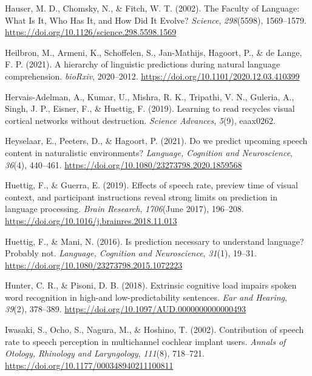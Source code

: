 \documentclass[a4paper, nobind]{templates/ociamthesis}
\newlength{\cslhangindent}
\newenvironment{CSLReferences}[2] %
 {%
  \setlength{\parindent}{0pt}
  \ifodd #1
  \let\oldpar\par
  \def\par{\hangindent=\cslhangindent\oldpar}
  \fi
  \setlength{\parskip}{1mm}
  \setlength{\baselineskip}{6mm}
 }%
 {}
\begin{document}
\begin{CSLReferences}{1}{0}
\leavevmode{}%
Hauser, M. D., Chomsky, N., \& Fitch, W. T. (2002). The Faculty of Language: What Is It, Who Has It, and How Did It Evolve? \emph{Science}, \emph{298}(5598), 1569--1579. \url{https://doi.org/10.1126/science.298.5598.1569}

\leavevmode{}%
Heilbron, M., Armeni, K., Schoffelen, S., Jan-Mathijs, Hagoort, P., \& de Lange, F. P. (2021). {A hierarchy of linguistic predictions during natural language comprehension}. \emph{bioRxiv}, 2020--2012. \url{https://doi.org/10.1101/2020.12.03.410399}

\leavevmode{}%
Hervais-Adelman, A., Kumar, U., Mishra, R. K., Tripathi, V. N., Guleria, A., Singh, J. P., Eisner, F., \& Huettig, F. (2019). Learning to read recycles visual cortical networks without destruction. \emph{Science Advances}, \emph{5}(9), eaax0262.

\leavevmode{}%
Heyselaar, E., Peeters, D., \& Hagoort, P. (2021). {Do we predict upcoming speech content in naturalistic environments?} \emph{Language, Cognition and Neuroscience}, \emph{36}(4), 440--461. \url{https://doi.org/10.1080/23273798.2020.1859568}

\leavevmode{}%
Huettig, F., \& Guerra, E. (2019). {Effects of speech rate, preview time of visual context, and participant instructions reveal strong limits on prediction in language processing}. \emph{Brain Research}, \emph{1706}(June 2017), 196--208. \url{https://doi.org/10.1016/j.brainres.2018.11.013}

\leavevmode{}%
Huettig, F., \& Mani, N. (2016). Is prediction necessary to understand language? Probably not. \emph{Language, Cognition and Neuroscience}, \emph{31}(1), 19--31. \url{https://doi.org/10.1080/23273798.2015.1072223}

\leavevmode{}%
Hunter, C. R., \& Pisoni, D. B. (2018). {Extrinsic cognitive load impairs spoken word recognition in high-and low-predictability sentences}. \emph{Ear and Hearing}, \emph{39}(2), 378--389. \url{https://doi.org/10.1097/AUD.0000000000000493}

\leavevmode{}%
Iwasaki, S., Ocho, S., Nagura, M., \& Hoshino, T. (2002). {Contribution of speech rate to speech perception in multichannel cochlear implant users}. \emph{Annals of Otology, Rhinology and Laryngology}, \emph{111}(8), 718--721. \url{https://doi.org/10.1177/000348940211100811}


\end{CSLReferences}
\end{document}
